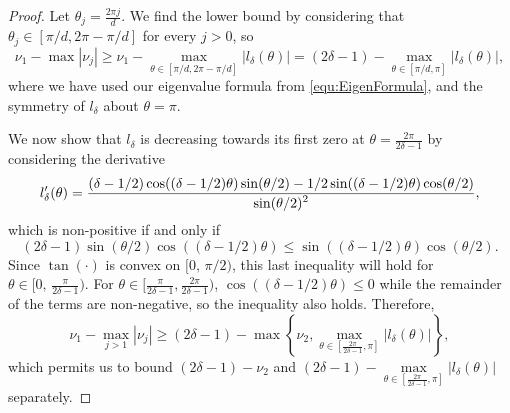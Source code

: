 \begin{proof}

Let $\theta_j = \frac{2 \pi j}{d}$.  We find the lower bound by considering that $\theta_j \in [\pi / d, 2\pi - \pi / d]$ for every $j > 0$, so 
\[\nu_1 - \max | \nu_j | \ge \nu_1 - \max_{\theta \in [\pi / d, 2\pi - \pi / d]} | l_\delta(\theta) | = (2 \delta - 1) - \max_{\theta \in [\pi / d, \pi]} | l_\delta(\theta) |,\]where we have used our eigenvalue formula from \eqref{equ:EigenFormula}, and the symmetry of $l_\delta$ about $\theta = \pi$.

We now show that $l_\delta$ is decreasing towards its first zero at $\theta = \frac{2 \pi}{2 \delta - 1}$ by considering the derivative \[l_\delta'(\theta) = \frac{\displaystyle (\delta - 1/2)\cos((\delta - 1/2)\theta) \sin(\theta/2) - 1/2 \sin((\delta - 1/2)\theta) \cos(\theta / 2)}{\displaystyle \sin(\theta / 2) ^ 2},\] which is non-positive if and only if \[(2\delta - 1) \sin(\theta/2)\cos((\delta - 1/2)\theta)  \le  \sin((\delta - 1/2)\theta) \cos(\theta /2 ).\]  Since $\tan(\cdot)$ is convex on $[0,\, \pi / 2)$, this last inequality will hold for $\theta \in [0,\, \frac{\pi}{2\delta - 1})$.  For $\theta \in [\frac{\pi}{2\delta-1}, \frac{2\pi}{2\delta -1})$, $\cos((\delta - 1/2)\theta) \leq 0$ while the remainder of the terms are non-negative, so the inequality also holds.  Therefore,
\[\nu_1 - \max_{j > 1} |\nu_j| \ge (2 \delta - 1) - \max \left\{\nu_2, \max_{\theta \in [\frac{2\pi}{2\delta-1}, \pi]} |l_\delta(\theta)| \right\},\]
which permits us to bound $(2 \delta - 1) - \nu_2$ and $(2 \delta - 1) - \max\limits_{\theta \in [\frac{2\pi}{2\delta-1}, \pi]} |l_\delta(\theta)|$ separately.



\end{proof}
